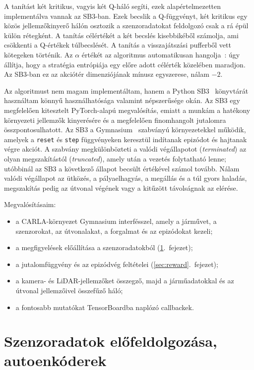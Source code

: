 \documentclass[a4paper,12pt,oneside]{article}
\begin{document}
A tanítást két kritikus, vagyis két Q-háló segíti, ezek alapértelmezetten implementálva vannak az SB3-ban.
Ezek becslik a Q-függvényt, két kritikus egy közös jellemzőkinyerő hálón
osztozik a szenzoradatokat feldolgozó csak a rá épül külön rétegként.
A tanítás célértékét a két becslés kisebbikéből számolja, ami csökkenti a
Q-értékek túlbecslését. A tanítás a visszajátszási
pufferből vett kötegeken történik. Az $\alpha$ értékét az algoritmus
automatikusan hangolja~\cite{haarnoja2018sacapps}: úgy állítja, hogy a
stratégia entrópiája egy előre adott célérték közelében maradjon. 
Az SB3-ban ez az akciótér dimenziójának mínusz egyszerese, nálam $-2$.


Az algoritmust nem magam implementáltam, hanem a Python
SB3~\cite{raffin2021sb3} könyvtárát használtam könnyű használhatósága valamint népszerűsége okán.
Az SB3 egy megfelelően kitesztelt PyTorch-alapú megvalósítás, emiatt
a munkám a hatékony környezeti jellemzők kinyerésére és a megfelelően finomhangolt jutalomra összpontosulhatott.
Az SB3 a Gymnasium~\cite{towers2024gymnasium} szabványú környezetekkel
működik, amelyek a \texttt{reset} és \texttt{step} függvényeken keresztül
indítanak epizódot és hajtanak végre akciót. A szabvány megkülönbözteti a
valódi végállapotot (\emph{terminated}) az olyan megszakítástól
(\emph{truncated}), amely után a vezetés folytatható lenne; utóbbinál az SB3
a következő állapot becsült értékével számol tovább. Nálam valódi végállapot
az ütközés, a pályaelhagyás, a megállás és a túl gyors haladás, megszakítás
pedig az útvonal végének vagy a kitűzött távolságnak az elérése.

Megvalósításaim:
\begin{itemize}
  \item a CARLA-környezet Gymnasium interfésszel, amely a járművet, a szenzorokat,
    az útvonalakat, a forgalmat és az epizódokat kezeli;
  \item a megfigyelések előállítása a szenzoradatokból
    (\ref{sec:sensors}.~fejezet);
  \item a jutalomfüggvény és az epizódvég feltételei
    (\ref{sec:reward}.~fejezet);
  \item a kamera- és LiDAR-jellemzőket összegző, majd a járműadatokkal és az
    útvonal jellemzőivel összefűző háló;
  \item a fontosabb mutatókat TensorBoardba naplózó callbackek.
\end{itemize}
\section{Szenzoradatok előfeldolgozása, autoenkóderek}
\label{sec:sensors}
\end{document}
